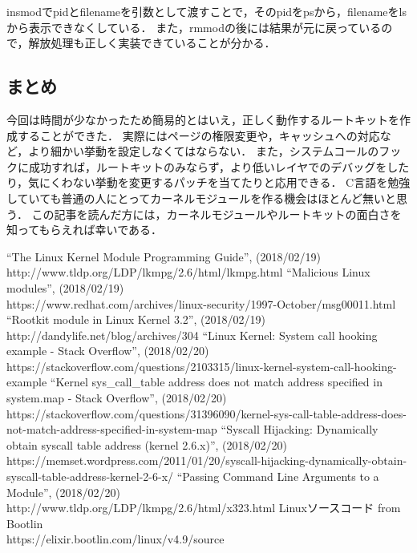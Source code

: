 \documentclass{jsarticle}
\begin{document}
  insmodでpidとfilenameを引数として渡すことで，そのpidをpsから，filenameをlsから表示できなくしている．
  また，rmmodの後には結果が元に戻っているので，解放処理も正しく実装できていることが分かる．

  \subsection{まとめ}
  今回は時間が少なかったため簡易的とはいえ，正しく動作するルートキットを作成することができた．
  実際にはページの権限変更や，キャッシュへの対応など，より細かい挙動を設定しなくてはならない．
  また，システムコールのフックに成功すれば，ルートキットのみならず，より低いレイヤでのデバッグをしたり，気にくわない挙動を変更するパッチを当てたりと応用できる．
  C言語を勉強していても普通の人にとってカーネルモジュールを作る機会はほとんど無いと思う．
  この記事を読んだ方には，カーネルモジュールやルートキットの面白さを知ってもらえれば幸いである．

  \begin{thebibliography}{99}
   ``The Linux Kernel Module Programming Guide'', (2018/02/19)\\
    http://www.tldp.org/LDP/lkmpg/2.6/html/lkmpg.html
   ``Malicious Linux modules'', (2018/02/19)\\
    https://www.redhat.com/archives/linux-security/1997-October/msg00011.html
   ``Rootkit module in Linux Kernel 3.2'', (2018/02/19)\\
    http://dandylife.net/blog/archives/304
   ``Linux Kernel: System call hooking example - Stack Overflow'', (2018/02/20)\\
    https://stackoverflow.com/questions/2103315/linux-kernel-system-call-hooking-example
   ``Kernel sys\_call\_table address does not match address specified in system.map - Stack Overflow'', (2018/02/20)\\
    https://stackoverflow.com/questions/31396090/kernel-sys-call-table-address-does-not-match-address-specified-in-system-map
   ``Syscall Hijacking: Dynamically obtain syscall table address (kernel 2.6.x)'', (2018/02/20)\\
    https://memset.wordpress.com/2011/01/20/syscall-hijacking-dynamically-obtain-syscall-table-address-kernel-2-6-x/
   ``Passing Command Line Arguments to a Module'', (2018/02/20)\\
    http://www.tldp.org/LDP/lkmpg/2.6/html/x323.html
   Linuxソースコード from Bootlin\\
    https://elixir.bootlin.com/linux/v4.9/source
  \end{thebibliography}
\end{document}
